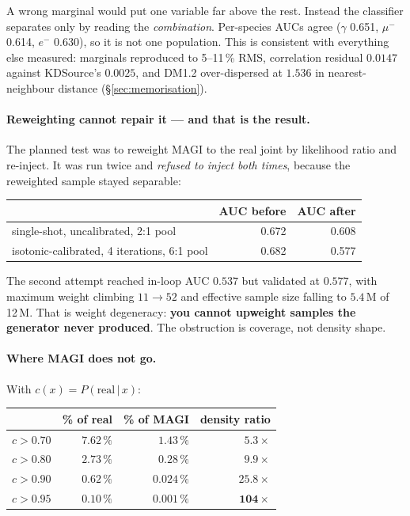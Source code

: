 \documentclass[11pt,a4paper]{article}
\begin{document}
A wrong marginal would put one variable far above the rest. Instead the
classifier separates only by reading the \emph{combination}. Per-species AUCs
agree ($\gamma$ 0.651, $\mu^-$ 0.614, $e^-$ 0.630), so it is not one population.
This is consistent with everything else measured: marginals reproduced to
5--11\,\% RMS, correlation residual $0.0147$ against KDSource's $0.0025$, and
DM1.2 over-dispersed at $1.536$ in nearest-neighbour distance
(\S\ref{sec:memorisation}).

\paragraph{Reweighting cannot repair it --- and that is the result.} The planned
test was to reweight MAGI to the real joint by likelihood ratio and re-inject. It
was run twice and \emph{refused to inject both times}, because the reweighted
sample stayed separable:

\begin{center}
\begin{tabular}{lrr}
\toprule
 & AUC before & AUC after \\
\midrule
single-shot, uncalibrated, 2:1 pool & 0.672 & 0.608 \\
isotonic-calibrated, 4 iterations, 6:1 pool & 0.682 & 0.577 \\
\bottomrule
\end{tabular}
\end{center}

The second attempt reached in-loop AUC $0.537$ but validated at $0.577$, with
maximum weight climbing $11 \to 52$ and effective sample size falling to
$5.4$\,M of 12\,M. That is weight degeneracy: \textbf{you cannot upweight samples
the generator never produced}. The obstruction is coverage, not density shape.

\paragraph{Where MAGI does not go.} With $c(x) = P(\text{real}\,|\,x)$:

\begin{center}
\begin{tabular}{lrrr}
\toprule
 & \% of real & \% of MAGI & density ratio \\
\midrule
$c>0.70$ & $7.62\,\%$ & $1.43\,\%$ & $5.3\times$ \\
$c>0.80$ & $2.73\,\%$ & $0.28\,\%$ & $9.9\times$ \\
$c>0.90$ & $0.62\,\%$ & $0.024\,\%$ & $25.8\times$ \\
$c>0.95$ & $0.10\,\%$ & $0.001\,\%$ & $\mathbf{104\times}$ \\
\bottomrule
\end{tabular}
\end{center}
\end{document}
